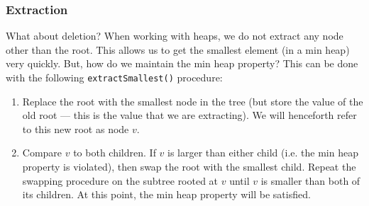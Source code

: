 \newpage

\subsubsection{Extraction}

What about deletion? When working with heaps, we do not extract any node other than the root. This allows us to get the smallest element (in a min heap) very quickly. But, how do we maintain the min heap property? This can be done with the following \verb!extractSmallest()! procedure:


\begin{enumerate}
    \item Replace the root with the smallest node in the tree (but store the value of the old root --- this is the value that we are extracting). We will henceforth refer to this new root as node $v$.
    \item Compare $v$ to both children. If $v$ is larger than either child (i.e. the min heap property is violated), then swap the root with the smallest child. Repeat the swapping procedure on the subtree rooted at $v$ until $v$ is smaller than both of its children. At this point, the min heap property will be satisfied.
\end{enumerate}


